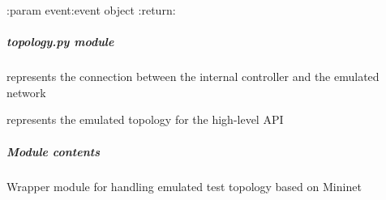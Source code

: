 \documentclass[letterpaper,10pt,english]{sphinxmanual}
\begin{document}
\begin{fulllineitems}
\begin{fulllineitems}
:param event:event object
:return: {\hyperref[adapt/cas_API:escape.adapt.cas_API.DeployNFFGEvent]{\emph{}}}

\end{fulllineitems}


\begin{fulllineitems}
\label{infr/il_API:escape.infr.il_API.InfrastructureLayerAPI.install_route}
\end{fulllineitems}


\end{fulllineitems}



\subparagraph{\emph{topology.py} module}
\label{infr/topology:topology-py-module}\label{infr/topology::doc}
{\hyperref[infr/topology:escape.infr.topology.InternalControllerProxy]{\emph{}}} represents the connection between the internal
controller and the emulated network

{\hyperref[infr/topology:escape.infr.topology.AbstractTopology]{\emph{}}} represents the emulated topology for the high-level API


\subparagraph{Module contents}
\label{infr/topology:module-contents}\label{infr/topology:module-escape.infr.topology}
Wrapper module for handling emulated test topology based on Mininet
\end{document}
